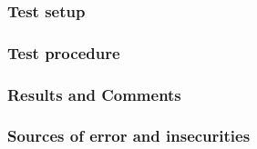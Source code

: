 \subsubsection*{Test setup}


\subsubsection*{Test procedure}
%
%


\subsubsection*{Results and Comments}

%
%
%
%
%
%
\subsubsection*{Sources of error and insecurities}
